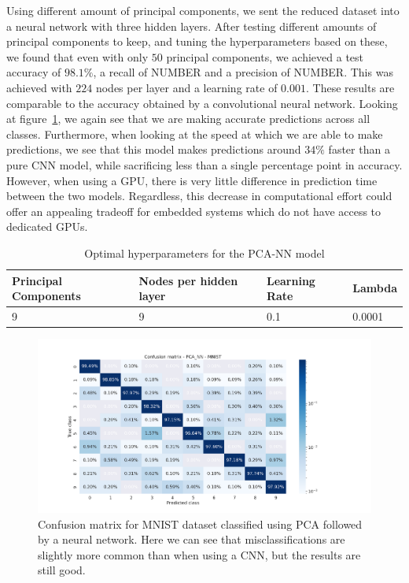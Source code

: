 \documentclass[onecolumn,10pt,cleanfoot]{asme2ej}
\begin{document}
Using different amount of principal components, we sent the reduced dataset into a neural network with three hidden layers. After testing different amounts of principal components to keep, and tuning the hyperparameters based on these, we found that even with only $50$ principal components, we achieved a test accuracy of $98.1\%$, a recall of NUMBER and a precision of NUMBER. This was achieved with $224$ nodes per layer and a learning rate of $0.001$. These results are comparable to the accuracy obtained by a convolutional neural network. Looking at figure~\ref{mnistheatmap_pcann}, we again see that we are making accurate predictions across all classes. Furthermore, when looking at the speed at which we are able to make predictions, we see that this model makes predictions around $34\%$ faster than a pure CNN model, while sacrificing less than a single percentage point in accuracy. However, when using a GPU, there is very little difference in prediction time between the two models. Regardless, this decrease in computational effort could offer an appealing tradeoff for embedded systems which do not have access to dedicated GPUs.

\begin{table}[H]
\caption{Optimal hyperparameters for the PCA-NN model}
\begin{center}
\label{pcanntable}
\begin{tabular}{| l | l | l | l |}
\hline
Principal Components & Nodes per hidden layer & Learning Rate & Lambda \\
\hline
9 & 9 & 0.1 & 0.0001 \\
\hline
\end{tabular}
\end{center}
\end{table}

\begin{figure}[H]
\centerline{\includegraphics[width=8in]{figure/conf_pca_nn_MNIST.png}}
\caption{Confusion matrix for MNIST dataset classified using PCA followed by a neural network. Here we can see that misclassifications are slightly more common than when using a CNN, but the results are still good.}
\label{mnistheatmap_pcann}
\end{figure}
\end{document}

